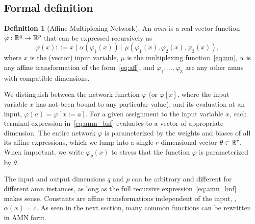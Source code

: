 \documentclass[10pt]{article}
\newcommand{\amn}{\varphi}
\newcommand{\id}{\mbox{\rm id}}
\theoremstyle{remark}
\theoremstyle{definition}
\newtheorem{definition}{Definition}
\theoremstyle{plain}
\begin{document}
\subsection{Formal definition}
\begin{definition}[Affine Multiplexing Network]
An \emph{\acl{amn}} is a real vector function
$\amn:\reals^q\to\reals^p$ that can be expressed recursively as
\begin{equation}
	\label{eq:amn_bnf}
	\amn(x) ::= x \mid \alpha(\amn_1(x)) \mid \mu(\amn_1(x),\amn_2(x),\amn_3(x)),
\end{equation}
where $x$ is the (vector) input variable,
$\mu$ is the multiplexing function~\eqref{eq:mu}, 
$\alpha$ is any affine transformation of the form~\eqref{eq:aff}, 
and $\amn_1,\ldots,\amn_3$ are any other
\aclp{amn} with compatible dimensions.
\end{definition}

We distinguish between the network function $\amn$ (or $\amn[x]$, where the
input variable $x$ has not been bound to any particular value), and its
evaluation at an input, $\amn(a)=\amn[x:=a]$.  For a given assignment to the
input variable $x$, each terminal expression in~\eqref{eq:amn_bnf} evaluates to
a vector of appropriate dimension. The entire network $\amn$ is parameterized
by the
weights and biases of all its affine expressions, which we lump into a
single $r$-dimensional vector $\theta\in\mathbb{R}^r$. When important, we write
$\amn_\theta(x)$ to stress that the function $\amn$ is parameterized by
$\theta$.

The input and output dimensions $q$ and $p$ can be arbitrary and
different for different \acs{amn} instances, as long
as the full recursive expression~\eqref{eq:amn_bnf} makes sense. Constants are
affine transformations independent of the input, \eg, $\alpha(x)=c$.  
As seen in the next section, many common functions can be rewritten in AMN form.
\end{document}
